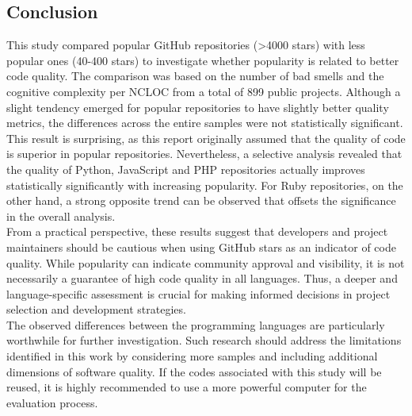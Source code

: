 \documentclass[a4paper, 12pt]{article}
\begin{document}
\subsection*{Conclusion}
This study compared popular GitHub repositories (>4000 stars) with less popular ones (40-400 stars) to investigate whether popularity is related to better code quality. The comparison was based on the number of bad smells and the cognitive complexity per NCLOC from a total of 899 public projects. Although a slight tendency emerged for popular repositories to have slightly better quality metrics, the differences across the entire samples were not statistically significant. This result is surprising, as this report originally assumed that the quality of code is superior in popular repositories. Nevertheless, a selective analysis revealed that the quality of Python, JavaScript and PHP repositories actually improves statistically significantly with increasing popularity. For Ruby repositories, on the other hand, a strong opposite trend can be observed that offsets the significance in the overall analysis.\\

From a practical perspective, these results suggest that developers and project maintainers should be cautious when using GitHub stars as an indicator of code quality. While popularity can indicate community approval and visibility, it is not necessarily a guarantee of high code quality in all languages. Thus, a deeper and language-specific assessment is crucial for making informed decisions in project selection and development strategies.\\

The observed differences between the programming languages are particularly worthwhile for further investigation. Such research should address the limitations identified in this work by considering more samples and including additional dimensions of software quality. If the codes associated with this study will be reused, it is highly recommended to use a more powerful computer for the evaluation process.\\
	
\end{document}
